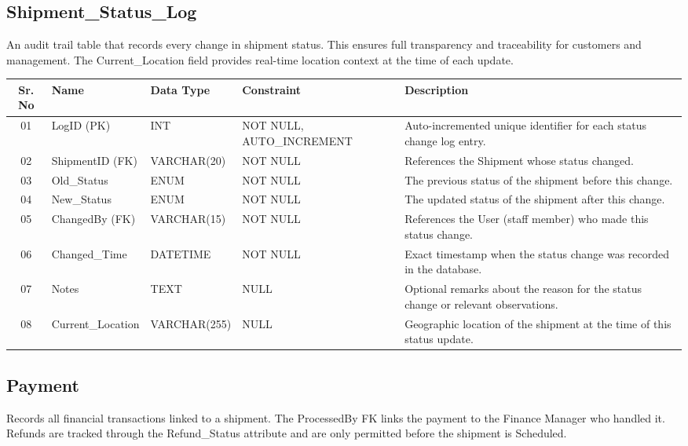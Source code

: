 \documentclass[12pt,a4paper]{report}
\begin{document}

\subsection{Shipment\_Status\_Log}

An audit trail table that records every change in shipment status. This ensures full transparency and traceability for customers and management. The Current\_Location field provides real-time location context at the time of each update.

\begin{longtable}{|c|p{3.8cm}|p{2.5cm}|p{3.5cm}|p{5.5cm}|}
\hline
\textbf{Sr. No} & \textbf{Name} & \textbf{Data Type} & \textbf{Constraint} & \textbf{Description} \\
\hline
01 & LogID (PK) & INT & NOT NULL, AUTO\_INCREMENT & Auto-incremented unique identifier for each status change log entry. \\
\hline
02 & ShipmentID (FK) & VARCHAR(20) & NOT NULL & References the Shipment whose status changed. \\
\hline
03 & Old\_Status & ENUM & NOT NULL & The previous status of the shipment before this change. \\
\hline
04 & New\_Status & ENUM & NOT NULL & The updated status of the shipment after this change. \\
\hline
05 & ChangedBy (FK) & VARCHAR(15) & NOT NULL & References the User (staff member) who made this status change. \\
\hline
06 & Changed\_Time & DATETIME & NOT NULL & Exact timestamp when the status change was recorded in the database. \\
\hline
07 & Notes & TEXT & NULL & Optional remarks about the reason for the status change or relevant observations. \\
\hline
08 & Current\_Location & VARCHAR(255) & NULL & Geographic location of the shipment at the time of this status update. \\
\hline
\end{longtable}


\subsection{Payment}

Records all financial transactions linked to a shipment. The ProcessedBy FK links the payment to the Finance Manager who handled it. Refunds are tracked through the Refund\_Status attribute and are only permitted before the shipment is Scheduled.
\end{document}
